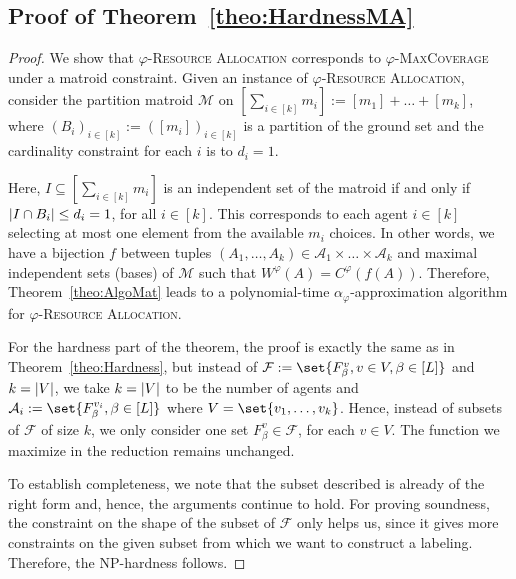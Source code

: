 \subsection{Proof of Theorem~\ref{theo:HardnessMA}}
\label{app:HardnessMA}
\begin{proof}
We show that $\varphi$-\textsc{Resource Allocation} corresponds to $\varphi$-\textsc{MaxCoverage} under a matroid constraint. Given an instance of $\varphi$-\textsc{Resource Allocation}, consider the partition matroid $\mathcal{M}$ on $[\sum_{i \in[k]} m_i] := [m_1] + \ldots + [m_k]$, where $(B_i)_{i \in [k]} := ([m_i])_{i \in [k]}$ is a partition of the ground set and the cardinality constraint  for each $i$ is to $d_i=1$. 

Here, $I \subseteq [\sum_{i \in[k]} m_i]$ is an independent set of the matroid if and only if $\abs{I \cap B_i} \leq d_i = 1$, for all $i \in [k]$. This corresponds to each agent $i \in [k]$ selecting at most one element from the available $m_i$ choices. In other words, we have a bijection $f$ between tuples $(A_1, \ldots, A_k) \in \mathcal{A}_1 \times \ldots \times \mathcal{A}_k$ and maximal independent sets (bases) of $\mathcal{M}$ such that $W^{\varphi}(A) = C^{\varphi}(f(A))$. Therefore, Theorem~\ref{theo:AlgoMat} leads to a polynomial-time $\alpha_{\varphi}$-approximation algorithm for $\varphi$-\textsc{Resource Allocation}. 

For the hardness part of the theorem, the proof is exactly the same as in Theorem~\ref{theo:Hardness}, but instead of $\mathcal{F} := \set{F^v_{\beta}, v \in V, \beta \in [L]}$ and $k = \abs{V}$, we take  $k = \abs{V}$ to be the number of agents and $\mathcal{A}_i := \set{F^{v_i}_{\beta}, \beta \in [L]}$ where $V =\set{v_1, \ldots, v_k}$. Hence, instead of subsets of $\mathcal{F}$ of size $k$, we only consider one set $F^v_{\beta} \in \mathcal{F}$, for each $v \in V$. The function we maximize in the reduction remains unchanged. 

To establish completeness, we note that the subset described is already of the right form and, hence, the arguments continue to hold. For proving soundness, the constraint on the shape of the subset of $\mathcal{F}$ only helps us, since it gives more constraints on the given subset from which we want to construct a labeling. Therefore, the \textrm{NP}-hardness follows.
\end{proof}
